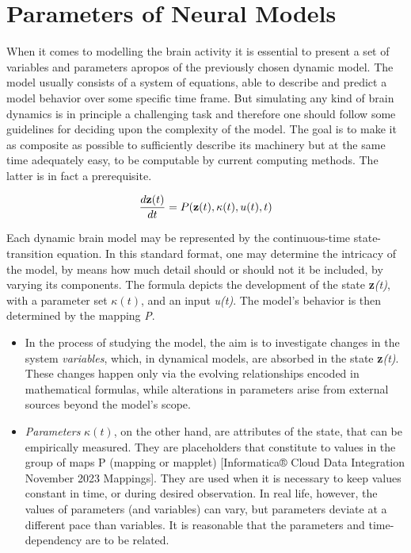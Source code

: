 \documentclass[class={myRUCProject}, crop=false]{standalone}
\begin{document}
 
\section{Parameters of Neural Models}

When it comes to modelling the brain activity it is essential to present a set of variables and parameters apropos of the previously chosen dynamic model. 
The model usually consists of a system of equations, able to describe and predict a model behavior over some specific time frame. But simulating any kind of brain dynamics is in principle a challenging task and therefore one should follow some guidelines for deciding upon the complexity of the model. The goal is to make it as composite as possible to sufficiently describe its machinery but at the same time adequately easy, to be computable by current computing methods. The latter is in fact a prerequisite.

\begin{equation}
    \frac{d\mathbf{z}(t)}{dt} = P(\mathbf{z}(t), \kappa(t), u(t),t)
\end{equation}

Each dynamic brain model may be represented by the continuous-time state-transition equation. In this standard format, one may determine the intricacy of the model, by means how much detail should or should not it be included, by varying its components. The formula depicts the development of the state \textbf{z}\textit{(t)}, with a parameter set \(\kappa (t)\), and an input \textit{u(t)}. The model’s behavior is then determined by the mapping \textit{P}. 

\begin{itemize}
    \item In the process of studying the model, the aim is to investigate changes in the system \textit{variables}, which, in dynamical models, are absorbed in the state \textbf{z}\textit{(t)}. These changes happen only via the evolving relationships encoded in mathematical formulas, while alterations in parameters arise from external sources beyond the model's scope. 
    \item \textit{Parameters} \(\kappa (t)\), on the other hand, are attributes of the state, that can be empirically measured. They are placeholders that constitute to values in the group of maps P (mapping or mapplet) [Informatica® Cloud Data Integration November 2023 Mappings]. They are used when it is necessary to keep values constant in time, or during desired observation. In real life, however, the values of parameters (and variables) can vary, but parameters deviate at a different pace than variables. It is reasonable that the parameters and time-dependency are to be related. 
\end{itemize} 
\end{document}
